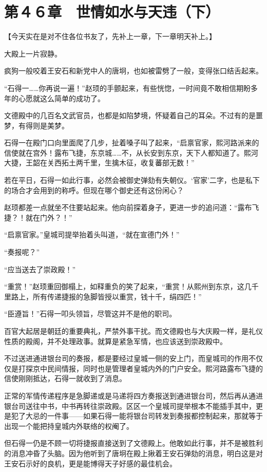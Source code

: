\section{第４６章　世情如水与天违（下）}

【今天实在是对不住各位书友了，先补上一章，下一章明天补上。】

大殿上一片寂静。

疯狗一般咬着王安石和新党中人的唐坰，也如被雷劈了一般，变得张口结舌起来。

“石得一……你再说一遍！”赵顼的手颤起来，有些恍惚，一时间竟不敢相信期盼多年的心愿就这么简单的成功了。

文德殿中的几百名文武官员，也都是如陷梦境，怀疑着自己的耳朵。不过有的是噩梦，有得则是美梦。

石得一在殿门口向里面爬了几步，扯着嗓子叫了起来，“启禀官家，熙河路派来的信使就在宫外！露布飞捷，东京城……不，从长安到东京，天下人都知道了。熙河大捷，王韶在关西拓土两千里，生擒木征，收复蕃部无数！”

若在平日，石得一如此行事，必然会被御史弹劾有失朝仪。‘官家’二字，也是私下的场合才会用到的称呼。但现在哪个御史还有这份闲心？

赵顼都差一点就坐不住要站起来。他向前探着身子，更进一步的追问道：“露布飞捷？！就在门外？！”

“启禀官家。”皇城司提举抬着头叫道，“就在宣德门外！”

“奏报呢？”

“应当送去了崇政殿！”

“重赏！”赵顼重回御榻上，如释重负的笑了起来，“重赏！从熙州到东京，这几千里路上，所有传递捷报的急脚皆授以重赏，钱十千，绢四匹！”

“臣遵旨！”石得一叩头领旨，尽管这并不是他的职司。

百官大起居是朝廷的重要典礼，严禁外事干扰。而文德殿也与大庆殿一样，是礼仪性质的殿阁，并不处理政事。就算是紧急军情，也应该送到崇政殿中。

不过送进通进银台司的奏报，都是要经过皇城一侧的安上门，而皇城司的作用不仅仅是打探京中民间情报，同时也是管理者皇城内外的门户安全。熙河路露布飞捷的信使刚刚抵达，石得一就收到了消息。

正常的军情传递程序是急脚递或是马递将四方奏报送到通进银台司，然后再从通进银台司送往中书，中书再转往崇政殿。区区一个皇城司提举根本不能插手其中，更是犯了大忌的一件事——如果石得一能将银台司转发到奏报都控制起来，那就等于出现一个能把持皇城内外联络的权阉了。

但石得一仍是不顾一切将捷报直接送到了文德殿上。他敢如此行事，并不是被胜利的消息冲昏了头脑。因为他听到了唐坰在殿上揪着王安石弹劾的消息，明白这是对王安石示好的良机，更是能博得天子好感的最佳机会。

